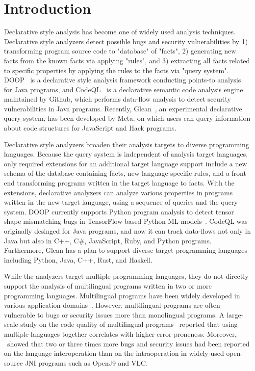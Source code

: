 \section{Introduction}
Declarative style analysis has become one of widely used analysis techniques.
Declarative style analyzers detect possible bugs and
security vulnerabilities by 1) transforming program source code to "database"
of "facts", 2) generating new facts from the known facts via applying
"rules", and 3) extracting all facts related to specific properties by
applying the rules to the facts via "query system".  DOOP~\cite{doop} is a
declarative style analysis framework conducting points-to analysis for Java
programs, and CodeQL~\cite{codeql} is a declarative semantic code analysis engine
maintained by Github, which performs data-flow analysis to detect security
vulnerabilities in Java programs.  Recently, Glean~\cite{glean}, an experimental
declarative query system, has been developed by Meta, on which users can query
information about code structures for JavaScript and Hack programs.

Declarative style analyzers broaden their analysis targets to diverse
programming languages. Because the query system is independent of analysis
target languages, only required extensions for an additional target language
support include a new schema of the database containing facts, new
language-specific rules, and a front-end transforming programs written in the
target language to facts. With the extensions, declarative analyzers can
analyze various properties in programs written in the new target language,
using a sequence of queries and the query system.  DOOP currently supports
Python program analysis to detect tensor shape mismatching bugs in TensorFlow
based Python ML models~\cite{lagouvardos2020static}. CodeQL was originally
desinged for Java programs, and now it can track data-flows not only in Java
but also in C++, C\#, JavaScript, Ruby, and Python programs.  Furthermore,
Glean has a plan to support diverse target programming languages including
Python, Java, C++, Rust, and Haskell.

While the analyzers target multiple programming languages, they do not directly
support the analysis of multilingual programs written in two or more
programming languages. Multilingual programs have been widely developed in
various application domains~\cite{kochhar2016large, mergendahlcross}. However,
multilingual programs are often vulnerable to bugs or security issues more than
monolingual programs. A large-scale study on the code quality of multilingual
programs~\cite{kochhar2016large} reported that using multiple languages
together correlates with higher error-proneness. Moreover,
\cite{grichi2020impact}~showed that two or three times more bugs and security
issues had been reported on the language interoperation than on the
intraoperation in widely-used open-source JNI programs such as OpenJ9 and VLC.

